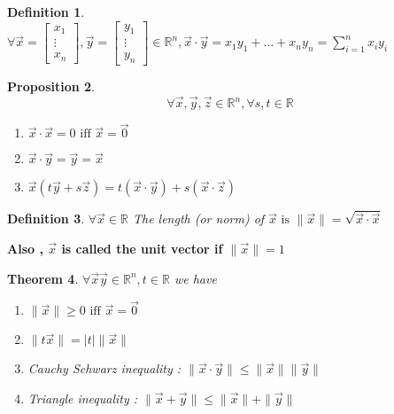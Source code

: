 \documentclass{article}
\newcounter{lecnum}
\newtheorem{theorem}{Theorem}[lecnum]
\newtheorem{proposition}[theorem]{Proposition}
\newtheorem{definition}[theorem]{Definition}
\begin{document}
\begin{definition} \( \forall \vec{x} = \begin{bmatrix} x_1 \\ \vdots \\ x_n \end{bmatrix} , \vec{y} = \begin{bmatrix} y_1 \\  \vdots \\ y_n \end{bmatrix} \in \mathbb{R}^n , \vec{x}\cdot \vec{y} = x_1y_1 + \ldots + x_ny_n = \sum\limits_{i=1}^{n} x_iy_i \)
\end{definition}

\begin{proposition}
\[\forall \vec{x} , \vec{y} , \vec{z} \in \mathbb{R}^n , \forall s, t \in \mathbb{R} \]
\begin{enumerate}
\item \(\vec{x} \cdot \vec{x} = 0  \text{ iff } \vec{x} = \vec{0} \)
\item \(\vec{x} \cdot \vec{y} = \vec{y} = \vec{x} \)
\item \(  \vec{x}  (t\vec{y} + s\vec{z}) = t(\vec{x} \cdot \vec{y}) + s(\vec{x} \cdot \vec{z}) \)
\end{enumerate}
\end{proposition}

\begin{definition} \( \forall \vec{x} \in \mathbb{R} \) The length (or norm) of \( \vec{x} \text{ is } \|\vec{x}\| = \sqrt{\vec{x}\cdot \vec{x}}\)\end{definition}
\textbf{Also , \( \vec{x} \) is called the unit vector if \( \|\vec{x}\| = 1\)}

\begin{theorem} \( \forall \vec{x} \vec{y} \in \mathbb{R}^n , t\in \mathbb{R} \) we have \\
\begin{enumerate}
\item \(\|\vec{x}\| \geq 0 \text{ iff } \vec{x} = \vec{0} \)
\item \(\|t\vec{x}\|  = \mid t \mid \|\vec{x}\| \)
\item Cauchy Schwarz inequality : \( \| \vec{x} \cdot \vec{y} \| \leq \|\vec{x}\| \|\vec{y}\| \)
\item Triangle inequality : \( \|\vec{x} + \vec{y}\| \leq \|\vec{x}\| + \|\vec{y}\| \)
\end{enumerate}
\end{theorem}
\end{document}
